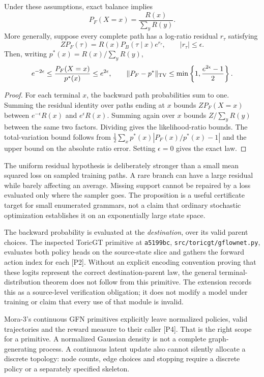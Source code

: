 \begin{proposition}
Under these assumptions, exact balance implies
\[
 P_F(X=x)=\frac{R(x)}{\sum_yR(y)}.
\]
More generally, suppose every complete path has a log-ratio residual $r_\tau$ satisfying
\[
 ZP_F(\tau)=R(x)P_B(\tau\mid x)e^{r_\tau},\qquad |r_\tau|\le\epsilon.
\]
Then, writing $p^*(x)=R(x)/\sum_yR(y)$,
\[
 e^{-2\epsilon}\le\frac{P_F(X=x)}{p^*(x)}\le e^{2\epsilon},\qquad
 \|P_F-p^*\|_{\rm TV}\le\min\left\{1,\frac{e^{2\epsilon}-1}{2}\right\}.
\]
\end{proposition}
\begin{proof}
For each terminal $x$, the backward path probabilities sum to one. Summing the residual identity over paths ending at $x$ bounds $ZP_F(X=x)$ between $e^{-\epsilon}R(x)$ and $e^{\epsilon}R(x)$. Summing again over $x$ bounds $Z/\sum_yR(y)$ between the same two factors. Dividing gives the likelihood-ratio bounds. The total-variation bound follows from $\frac12\sum_x p^*(x)|P_F(x)/p^*(x)-1|$ and the upper bound on the absolute ratio error. Setting $\epsilon=0$ gives the exact law.
\end{proof}

The uniform residual hypothesis is deliberately stronger than a small mean squared loss on sampled training paths. A rare branch can have a large residual while barely affecting an average. Missing support cannot be repaired by a loss evaluated only where the sampler goes. The proposition is a useful certificate target for small enumerated grammars, not a claim that ordinary stochastic optimization establishes it on an exponentially large state space.

The backward probability is evaluated at the \emph{destination}, over its valid parent choices. The inspected ToricGT primitive at \texttt{a5199bc}, \texttt{src/toricgt/gflownet.py}, evaluates both policy heads on the source-state slice and gathers the forward action index for each [P2]. Without an explicit encoding convention proving that these logits represent the correct destination-parent law, the general terminal-distribution theorem does not follow from this primitive. The extension records this as a source-level verification obligation; it does not modify a model under training or claim that every use of that module is invalid.

Mora-3's continuous GFN primitives explicitly leave normalized policies, valid trajectories and the reward measure to their caller [P4]. That is the right scope for a primitive. A normalized Gaussian density is not a complete graph-generating process. A continuous latent update also cannot silently allocate a discrete topology: node counts, edge choices and stopping require a discrete policy or a separately specified skeleton.

